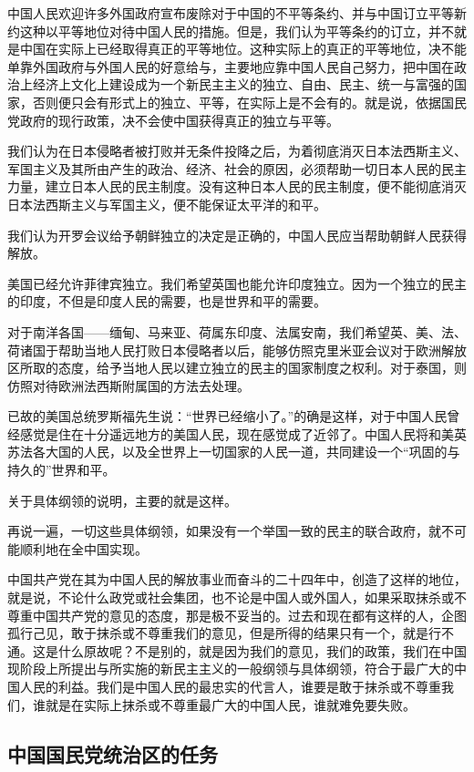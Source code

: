 中国人民欢迎许多外国政府宣布废除对于中国的不平等条约、并与中国订立平等新约这种以平等地位对待中国人民的措施。但是，我们认为平等条约的订立，并不就是中国在实际上已经取得真正的平等地位。这种实际上的真正的平等地位，决不能单靠外国政府与外国人民的好意给与，主要地应靠中国人民自己努力，把中国在政治上经济上文化上建设成为一个新民主主义的独立、自由、民主、统一与富强的国家，否则便只会有形式上的独立、平等，在实际上是不会有的。就是说，依据国民党政府的现行政策，决不会使中国获得真正的独立与平等。

我们认为在日本侵略者被打败并无条件投降之后，为着彻底消灭日本法西斯主义、军国主义及其所由产生的政治、经济、社会的原因，必须帮助一切日本人民的民主力量，建立日本人民的民主制度。没有这种日本人民的民主制度，便不能彻底消灭日本法西斯主义与军国主义，便不能保证太平洋的和平。

我们认为开罗会议给予朝鲜独立的决定是正确的，中国人民应当帮助朝鲜人民获得解放。

美国已经允许菲律宾独立。我们希望英国也能允许印度独立。因为一个独立的民主的印度，不但是印度人民的需要，也是世界和平的需要。

对于南洋各国——缅甸、马来亚、荷属东印度、法属安南，我们希望英、美、法、荷诸国于帮助当地人民打败日本侵略者以后，能够仿照克里米亚会议对于欧洲解放区所取的态度，给予当地人民以建立独立的民主的国家制度之权利。对于泰国，则仿照对待欧洲法西斯附属国的方法去处理。

已故的美国总统罗斯福先生说：“世界已经缩小了。”的确是这样，对于中国人民曾经感觉是住在十分遥远地方的美国人民，现在感觉成了近邻了。中国人民将和美英苏法各大国的人民，以及全世界上一切国家的人民一道，共同建设一个“巩固的与持久的”世界和平。

关于具体纲领的说明，主要的就是这样。

再说一遍，一切这些具体纲领，如果没有一个举国一致的民主的联合政府，就不可能顺利地在全中国实现。

中国共产党在其为中国人民的解放事业而奋斗的二十四年中，创造了这样的地位，就是说，不论什么政党或社会集团，也不论是中国人或外国人，如果采取抹杀或不尊重中国共产党的意见的态度，那是极不妥当的。过去和现在都有这样的人，企图孤行己见，敢于抹杀或不尊重我们的意见，但是所得的结果只有一个，就是行不通。这是什么原故呢？不是别的，就是因为我们的意见，我们的政策，我们在中国现阶段上所提出与所实施的新民主主义的一般纲领与具体纲领，符合于最广大的中国人民的利益。我们是中国人民的最忠实的代言人，谁要是敢于抹杀或不尊重我们，谁就是在实际上抹杀或不尊重最广大的中国人民，谁就难免要失败。

\subsection{中国国民党统治区的任务}

